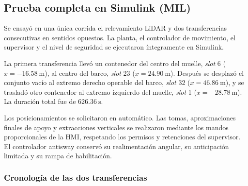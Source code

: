 \documentclass[a4paper,10pt,onecolumn,journal]{ieeeconf}
\numberwithin{equation}{section}
\begin{document}



\subsection{Prueba completa en Simulink (MIL)}
\label{subsec:prueba_completa_MIL}

Se ensayó en una única corrida el relevamiento LiDAR y dos transferencias consecutivas en sentidos opuestos. La planta, el controlador de movimiento, el supervisor y el nivel de seguridad se ejecutaron íntegramente en Simulink.

La primera transferencia llevó un contenedor del centro del muelle, \textit{slot} 6 ($x=-16.58~\mathrm{m}$), al centro del barco, \textit{slot} 23 ($x=24.90~\mathrm{m}$). Después se desplazó el conjunto vacío al extremo derecho operable del barco, \textit{slot} 32 ($x=46.86~\mathrm{m}$), y se trasladó otro contenedor al extremo izquierdo del muelle, \textit{slot} 1 ($x=-28.78~\mathrm{m}$). La duración total fue de $626.36~\mathrm{s}$.

Los posicionamientos se solicitaron en automático. Las tomas, aproximaciones finales de apoyo y extracciones verticales se realizaron mediante los mandos proporcionales de la HMI, respetando los permisos y retenciones del supervisor. El controlador antisway conservó su realimentación angular, su anticipación limitada y su rampa de habilitación.


\subsubsection{Cronología de las dos transferencias}
\end{document}
